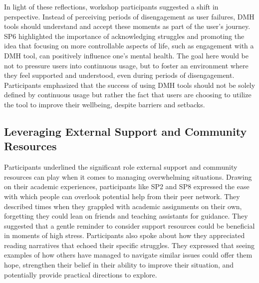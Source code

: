 

In light of these reflections, workshop participants suggested a shift in perspective. Instead of perceiving periods of disengagement as user failures, DMH tools should understand and accept these moments as part of the user's journey. SP6 highlighted the importance of acknowledging struggles and promoting the idea that focusing on more controllable aspects of life, such as engagement with a DMH tool, can positively influence one's mental health. 
The goal here would be not to pressure users into continuous usage, but to foster an environment where they feel supported and understood, even during periods of disengagement. Participants emphasized that the success of using DMH tools should not be solely defined by continuous usage but rather the fact that users are choosing to utilize the tool to improve their wellbeing, despite barriers and setbacks. 


\subsection{Leveraging External Support and Community Resources}
Participants underlined the significant role external support and community resources can play when it comes to managing overwhelming situations. 
Drawing on their academic experiences, participants like SP2 and SP8 expressed the ease with which people can overlook potential help from their peer network. They described times when they grappled with academic assignments on their own, forgetting they could lean on friends and teaching assistants for guidance. They suggested that a gentle reminder to consider support resources could be beneficial in moments of high stress. Participants also spoke about how they appreciated reading narratives that echoed their specific struggles. They expressed that seeing examples of how others have managed to navigate similar issues could offer them hope, strengthen their belief in their ability to improve their situation, and potentially provide practical directions to explore.

